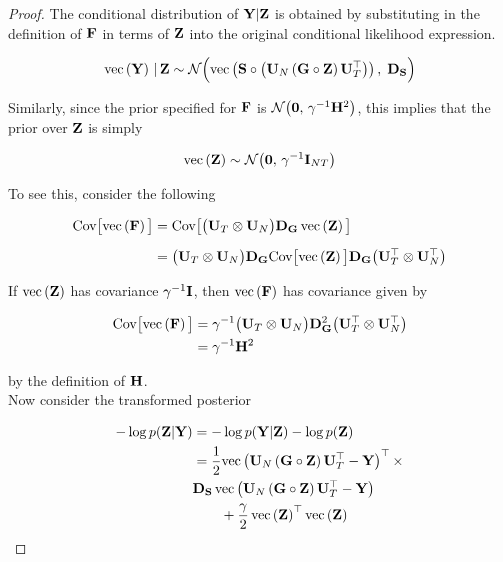     
    \begin{proof}
    
    The conditional distribution of $\Y | \Z$ is obtained by substituting in the definition of $\F$ in terms of $\Z$ into the original conditional likelihood expression.  
    
    $$
    \vecc{\Y} \, | \, \Z \sim \mathcal{N}\Big(\vecc{\Ss \circ \big(\U_N \, (\G \circ \Z) \, \U_T^\top\big)}, \; \D_{\Ss}\Big)
    $$
    
    Similarly, since the prior specified for $\F$ is $\mathcal{N}\big(\mathbf{0}, \, \gamma^{-1} \HH^2\big)$, this implies that the prior over $\Z$ is simply
    
    $$
    \vecc{\Z} \sim \mathcal{N}\big(\mathbf{0}, \, \gamma^{-1} \I_{NT} \big) 
    $$
    
    To see this, consider the following
    
    
    \begin{align*}
    \text{Cov}\big[\vecc{\F}\big] &=  \text{Cov}\big[\big(\U_T \otimes \U_N\big) \D_\G \, \vecc{\Z}\big]  \\[0.2cm]
    &= \big(\U_T \otimes \U_N\big) \D_\G \text{Cov}\big[\vecc{\Z}\big] \D_\G \big(\U_T^\top \otimes \U_N^\top \big) 
    \end{align*}
    
    \vspace{0.2cm}
    
    If $\vecc{\Z}$ has covariance $\gamma^{-1} \I$, then $\vecc{\F}$ has covariance given by 
    
    \begin{align*}
    \text{Cov}\big[\vecc{\F}\big] &= \gamma^{-1} \big(\U_T \otimes \U_N\big) \D_\G^2 \big(\U_T^\top \otimes \U_N^\top \big) \\
    &= \gamma^{-1} \HH^{2}
    \end{align*}
    
    \noindent by the definition of $\HH$.\\
    
    Now consider the transformed posterior 
    
    \begin{align*}
    -\log p(\Z | \Y) &= -\log p(\Y | \Z) -\log p(\Z) \\
    &= \frac{1}{2} \vecc{\U_N \, (\G \circ \Z) \, \U_T^\top - \Y}^\top \times \\ &  \D_\Ss \,  \vecc{\U_N \, (\G \circ \Z) \, \U_T^\top- \Y} \\ & \quad\quad   +\frac{\gamma}{2} \, \vecc{\Z}^\top \vecc{\Z}
    \end{align*}
    

\end{proof}
